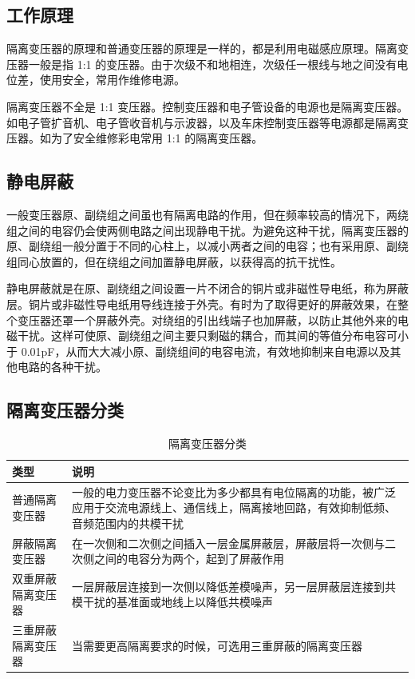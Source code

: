 \documentclass[12pt,UTF8]{ctexbook}
\begin{document}
\subsection{工作原理}

隔离变压器的原理和普通变压器的原理是一样的，都是利用电磁感应原理。隔离变压器一般是指 1:1 的变压器。由于次级不和地相连，次级任一根线与地之间没有电位差，使用安全，常用作维修电源。

隔离变压器不全是 1:1 变压器。控制变压器和电子管设备的电源也是隔离变压器。如电子管扩音机、电子管收音机与示波器，以及车床控制变压器等电源都是隔离变压器。如为了安全维修彩电常用 1:1 的隔离变压器。

\subsection{静电屏蔽}

一般变压器原、副绕组之间虽也有隔离电路的作用，但在频率较高的情况下，两绕组之间的电容仍会使两侧电路之间出现静电干扰。为避免这种干扰，隔离变压器的原、副绕组一般分置于不同的心柱上，以减小两者之间的电容；也有采用原、副绕组同心放置的，但在绕组之间加置静电屏蔽，以获得高的抗干扰性。

静电屏蔽就是在原、副绕组之间设置一片不闭合的铜片或非磁性导电纸，称为屏蔽层。铜片或非磁性导电纸用导线连接于外壳。有时为了取得更好的屏蔽效果，在整个变压器还罩一个屏蔽外壳。对绕组的引出线端子也加屏蔽，以防止其他外来的电磁干扰。这样可使原、副绕组之间主要只剩磁的耦合，而其间的等值分布电容可小于 0.01pF，从而大大减小原、副绕组间的电容电流，有效地抑制来自电源以及其他电路的各种干扰。

\subsection{隔离变压器分类}

\begin{table}[htbp]
\centering
\caption{隔离变压器分类}
\begin{tabular}{|p{3cm}|p{9cm}|}
\hline
\textbf{类型} & \textbf{说明} \\
\hline
普通隔离变压器 & 一般的电力变压器不论变比为多少都具有电位隔离的功能，被广泛应用于交流电源线上、通信线上，隔离接地回路，有效抑制低频、音频范围内的共模干扰\\
\hline
屏蔽隔离变压器 & 在一次侧和二次侧之间插入一层金属屏蔽层，屏蔽层将一次侧与二次侧之间的电容分为两个，起到了屏蔽作用\\
\hline
双重屏蔽隔离变压器 & 一层屏蔽层连接到一次侧以降低差模噪声，另一层屏蔽层连接到共模干扰的基准面或地线上以降低共模噪声\\
\hline
三重屏蔽隔离变压器 & 当需要更高隔离要求的时候，可选用三重屏蔽的隔离变压器\\
\hline
\end{tabular}
\end{table}
\end{document}
